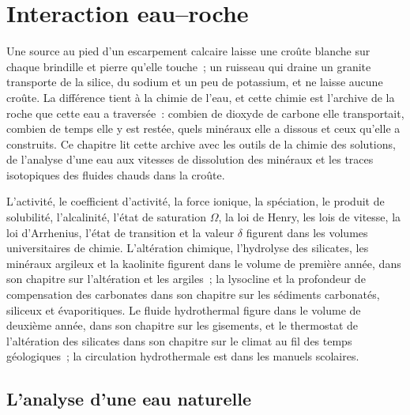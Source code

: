 \chapter{Interaction eau--roche}\label{ch:b3:water-rock-interaction}

Une source au pied d'un escarpement calcaire laisse une croûte blanche sur chaque
brindille et pierre qu'elle touche~; un ruisseau qui draine un granite transporte de la silice, du sodium
et un peu de potassium, et ne laisse aucune croûte. La différence tient à la
chimie de l'eau, et cette chimie est l'archive de la roche que cette eau a traversée~:
combien de dioxyde de carbone elle transportait, combien de temps elle y est restée, quels
minéraux elle a dissous et ceux qu'elle a construits. Ce chapitre lit cette archive avec
les outils de la chimie des solutions, de l'analyse d'une eau aux vitesses de
dissolution des minéraux et les traces isotopiques des fluides chauds dans la croûte.

\begin{recall}
L'activité, le coefficient d'activité, la force ionique, la spéciation, le produit
de solubilité, l'alcalinité, l'état de saturation $\Omega$, la loi de Henry, les lois de vitesse,
la loi d'Arrhenius, l'état de transition et la valeur $\delta$ figurent dans les
volumes universitaires de chimie. L'altération chimique, l'hydrolyse des
silicates, les minéraux argileux et la kaolinite figurent dans le volume de première année, dans son
chapitre sur l'altération et les argiles~; la lysocline et la profondeur de compensation
des carbonates dans son chapitre sur les sédiments carbonatés, siliceux et évaporitiques. Le
fluide hydrothermal figure dans le volume de deuxième année, dans son chapitre sur les gisements,
et le thermostat de l'altération des silicates dans son chapitre sur le climat au fil
des temps géologiques~; la circulation hydrothermale est dans les manuels scolaires.
\end{recall}

\section{L'analyse d'une eau naturelle}\label{sec:b3:water-rock-interaction:analysis}

